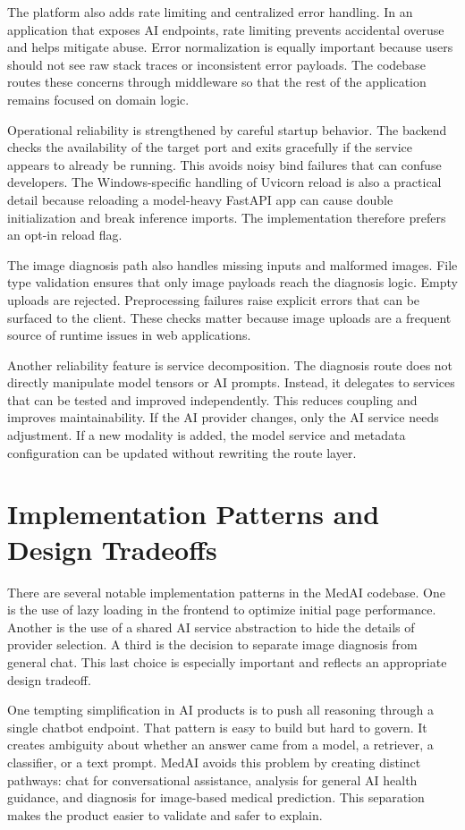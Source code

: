 \documentclass[conference]{IEEEtran}
\begin{document}
The platform also adds rate limiting and centralized error handling. In an application that exposes AI endpoints, rate limiting prevents accidental overuse and helps mitigate abuse. Error normalization is equally important because users should not see raw stack traces or inconsistent error payloads. The codebase routes these concerns through middleware so that the rest of the application remains focused on domain logic.

Operational reliability is strengthened by careful startup behavior. The backend checks the availability of the target port and exits gracefully if the service appears to already be running. This avoids noisy bind failures that can confuse developers. The Windows-specific handling of Uvicorn reload is also a practical detail because reloading a model-heavy FastAPI app can cause double initialization and break inference imports. The implementation therefore prefers an opt-in reload flag.

The image diagnosis path also handles missing inputs and malformed images. File type validation ensures that only image payloads reach the diagnosis logic. Empty uploads are rejected. Preprocessing failures raise explicit errors that can be surfaced to the client. These checks matter because image uploads are a frequent source of runtime issues in web applications.

Another reliability feature is service decomposition. The diagnosis route does not directly manipulate model tensors or AI prompts. Instead, it delegates to services that can be tested and improved independently. This reduces coupling and improves maintainability. If the AI provider changes, only the AI service needs adjustment. If a new modality is added, the model service and metadata configuration can be updated without rewriting the route layer.

\section{Implementation Patterns and Design Tradeoffs}
There are several notable implementation patterns in the MedAI codebase. One is the use of lazy loading in the frontend to optimize initial page performance. Another is the use of a shared AI service abstraction to hide the details of provider selection. A third is the decision to separate image diagnosis from general chat. This last choice is especially important and reflects an appropriate design tradeoff.

One tempting simplification in AI products is to push all reasoning through a single chatbot endpoint. That pattern is easy to build but hard to govern. It creates ambiguity about whether an answer came from a model, a retriever, a classifier, or a text prompt. MedAI avoids this problem by creating distinct pathways: chat for conversational assistance, analysis for general AI health guidance, and diagnosis for image-based medical prediction. This separation makes the product easier to validate and safer to explain.
\end{document}
